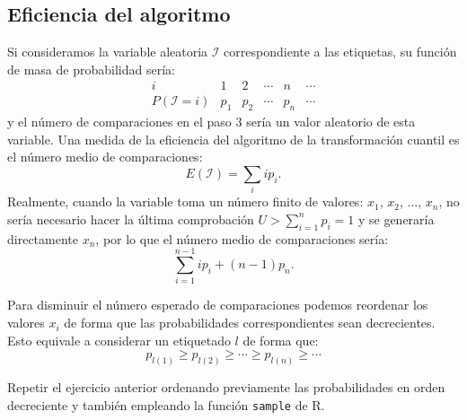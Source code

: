 \documentclass[]{book}
\newenvironment{Shaded}{\begin{snugshade}}{\end{snugshade}}
\newcommand{\KeywordTok}[1]{\textcolor[rgb]{0.13,0.29,0.53}{\textbf{#1}}}
\newcommand{\DataTypeTok}[1]{\textcolor[rgb]{0.13,0.29,0.53}{#1}}
\newcommand{\DecValTok}[1]{\textcolor[rgb]{0.00,0.00,0.81}{#1}}
\newcommand{\StringTok}[1]{\textcolor[rgb]{0.31,0.60,0.02}{#1}}
\newcommand{\OperatorTok}[1]{\textcolor[rgb]{0.81,0.36,0.00}{\textbf{#1}}}
\newcommand{\NormalTok}[1]{#1}
\theoremstyle{definition}
\theoremstyle{definition}
\theoremstyle{definition}
\theoremstyle{remark}
\let\BeginKnitrBlock\begin \let\EndKnitrBlock\end
\begin{document}
\begin{Shaded}
\end{Shaded}

\subsection{Eficiencia del algoritmo}\label{eficiencia-del-algoritmo-1}

Si consideramos la variable aleatoria \(\mathcal{I}\) correspondiente a
las etiquetas, su función de masa de probabilidad sería:
\[\begin{array}{l|ccccc}
i & 1 & 2 & \cdots & n & \cdots \\ \hline
P\left( \mathcal{I}=i\right) & p_{1} & p_{2} & \cdots & p_{n} & \cdots 
\end{array}\] y el número de comparaciones en el paso 3 sería un valor
aleatorio de esta variable. Una medida de la eficiencia del algoritmo de
la transformación cuantil es el número medio de comparaciones:
\[E\left( \mathcal{I}\right) =\sum_i ip_{i}.\] Realmente, cuando la
variable toma un número finito de valores: \(x_{1}\), \(x_{2}\),
\(\ldots\), \(x_{n}\), no sería necesario hacer la última comprobación
\(U>\sum_{i=1}^{n}p_{i}=1\) y se generaría directamente \(x_{n}\), por
lo que el número medio de comparaciones sería:
\[\sum_{i=1}^{n-1}ip_{i}+\left( n-1\right)  p_{n}.\]

Para disminuir el número esperado de comparaciones podemos reordenar los
valores \(x_{i}\) de forma que las probabilidades correspondientes sean
decrecientes. Esto equivale a considerar un etiquetado \(l\) de forma
que:
\[p_{l\left( 1\right) }\geq p_{l\left( 2\right) }\geq \cdots \geq p_{l\left(
n\right) }\geq \cdots\]

\BeginKnitrBlock{exercise}
\protect\hypertarget{exr:unnamed-chunk-16}{}{\label{exr:unnamed-chunk-16} }
\EndKnitrBlock{exercise}

Repetir el ejercicio anterior ordenando previamente las probabilidades
en orden decreciente y también empleando la función \texttt{sample} de
R.
\end{document}
